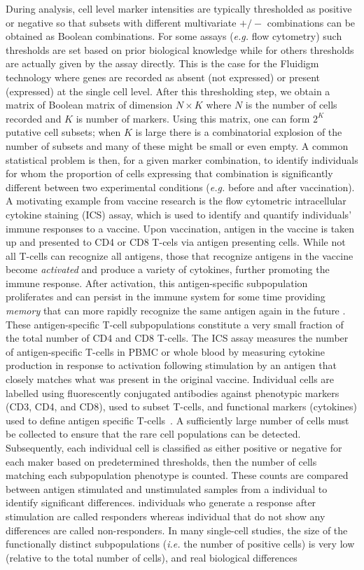 \documentclass[11pt]{article}
\begin{document}
During analysis, cell level marker intensities are typically thresholded as positive or negative so that subsets with different multivariate $+/-$ combinations can be obtained as Boolean combinations. For some assays (\textit{e.g.} flow cytometry) such thresholds are set based on prior biological knowledge while for others thresholds are actually given by the assay directly. This is the case for the Fluidigm technology where genes are recorded as absent (not expressed) or present (expressed) at the single cell level. After this thresholding step, we obtain a matrix of Boolean matrix of dimension $N\times K$ where $N$ is the number of cells recorded and $K$ is number of markers. Using this matrix, one can form $2^K$ putative cell subsets; when $K$ is large there is a combinatorial explosion of the number of subsets and many of these might be small or even empty. A common statistical problem is then, for a given marker combination, to identify individuals for whom the proportion of cells expressing that combination is significantly different between two experimental conditions (\textit{e.g.} before and after vaccination). A motivating example from vaccine research is the flow cytometric intracellular cytokine staining (ICS) assay, which is used to identify and quantify individuals' immune responses to a vaccine. Upon vaccination, antigen in the vaccine is taken up and presented to CD4 or CD8 T-cels via antigen presenting cells. While not all T-cells can recognize all antigens, those that recognize antigens in the vaccine become \emph{activated} and produce a variety of cytokines, further promoting the immune response. After activation, this antigen-specific subpopulation proliferates and can persist in the immune system for some time providing \emph{memory} that can more rapidly recognize the same antigen again in the future \cite{McKinstry:2010ei}. These antigen-specific T-cell subpopulations constitute a very small fraction of the total number of CD4 and CD8 T-cells. The ICS assay measures the number of antigen-specific T-cells in PBMC or whole blood by measuring cytokine production in response to activation following stimulation by an antigen that closely matches what was present in the original vaccine. Individual cells are labelled using fluorescently conjugated antibodies against phenotypic markers (CD3, CD4, and CD8), used to subset T-cells, and functional markers (cytokines) used to define antigen specific T-cells~\cite{Horton:2007tsa,DeRosa:2004wp,Betts:2006dw}. A sufficiently large number of cells must be collected to ensure that the rare cell populations can be detected. Subsequently, each individual cell is classified as either positive or negative for each maker based on predetermined thresholds, then the number of cells matching each subpopulation phenotype is counted. These counts are compared between antigen stimulated and unstimulated samples from a individual to identify significant differences. individuals who generate a response after stimulation are called responders whereas individual that do not show any differences are called non-responders. In many single-cell studies, the size of the functionally distinct subpopulations (\textit{i.e.} the number of positive cells) is very low (relative to the total number of cells), and real biological differences 
\end{document}

